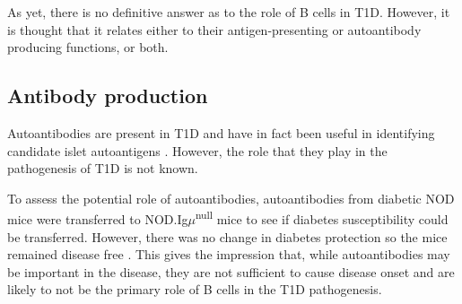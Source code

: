 
As yet, there is no definitive answer as to the role of B cells in T1D.
However, it is thought that it relates either to their antigen-presenting or autoantibody producing functions, or both.

\subsection{Antibody production}

Autoantibodies are present in T1D and have in fact been useful in identifying candidate islet autoantigens \citep{Roep2012}.
However, the role that they play in the pathogenesis of T1D is not known.

To assess the potential role of autoantibodies, autoantibodies from diabetic NOD mice were transferred to NOD.Ig$\mu$\textsuperscript{null} mice to see if diabetes susceptibility could be transferred.
However, there was no change in diabetes protection so the mice remained disease free \citep{Serreze1998}.
This gives the impression that, while autoantibodies may be important in the disease, they are not sufficient to cause disease onset and are likely to not be the primary role of B cells in the T1D pathogenesis.


